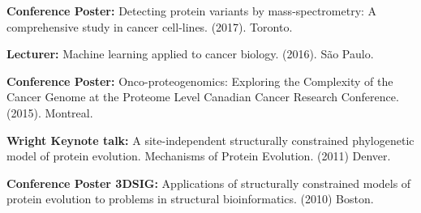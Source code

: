 


\begin{cventries}
\cventryshort
{
\begin{cvenum}
	\item \textbf{Conference Poster:} Detecting protein variants by mass-spectrometry: A comprehensive study in cancer cell-lines. (2017). Toronto.
	\item \textbf{Lecturer:} Machine learning applied to cancer biology. (2016). São Paulo. 
	\item \textbf{Conference Poster:} Onco-proteogenomics: Exploring the Complexity of the Cancer Genome at the Proteome Level  Canadian Cancer Research Conference. (2015). Montreal. 
	\item \textbf{Wright Keynote talk:} A site-independent structurally constrained phylogenetic model of protein evolution. Mechanisms of Protein Evolution. (2011) Denver.  
	\item \textbf{Conference Poster 3DSIG:} Applications of structurally constrained models of protein evolution to problems in structural bioinformatics. (2010) Boston. 
\end{cvenum}
}
\end{cventries}
